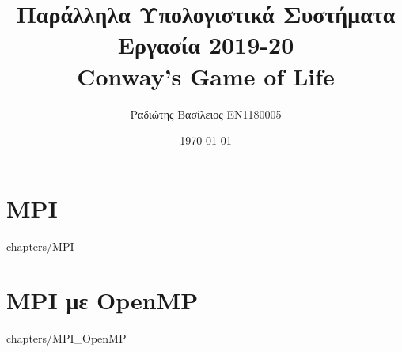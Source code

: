 \documentclass[a4paper,twoside,12pt]{report}
\title {Παράλληλα Υπολογιστικά Συστήματα\\Εργασία 2019-20\\Conway’s Game of Life}
\author {Ραδιώτης Βασίλειος EN1180005}
\date {\today}
\begin{document}
\maketitle

\tableofcontents{}

\chapter {MPI}
     {chapters/MPI}

\chapter {MPI με OpenMP}
     {chapters/MPI_OpenMP}
\end{document}

